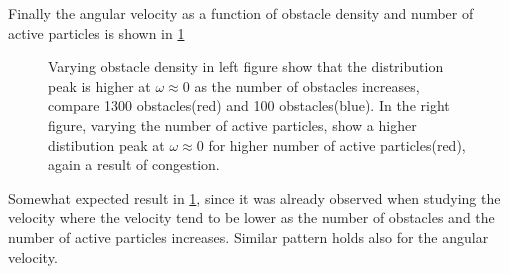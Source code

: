 Finally the angular velocity as a function of obstacle density and number of active particles is 
shown in \cref{fig:angvelkde_1WNCNB}


\begin{figure}[htbp!]
\centering
\caption{Varying obstacle density in left figure show that the distribution 
	peak is higher at $\omega\approx0$ as the number of obstacles increases, 
	compare \num{1300} obstacles(red) and \num{100} obstacles(blue). In 
	the right figure, varying the number of active particles, show a higher 
	distibution peak at $\omega\approx0$ for higher number of active particles(red), 
	again a result of congestion. 
} 
\label{fig:angvelkde_1WNCNB}
\end{figure}

Somewhat expected result in \cref{fig:angvelkde_1WNCNB}, since it was already observed when 
studying the velocity where the velocity tend to be lower as the number of obstacles and the 
number of active particles increases. Similar pattern holds also for the angular velocity.




